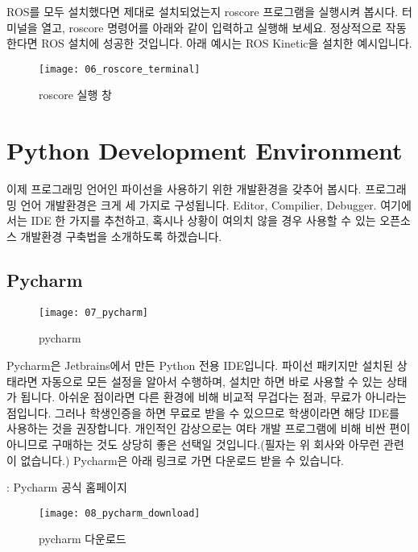 \documentclass[11pt,fleqn]{book} %
\begin{document}
ROS를 모두 설치했다면 제대로 설치되었는지 roscore 프로그램을 실행시켜 봅시다.
터미널을 열고, roscore 명령어를 아래와 같이 입력하고 실행해 보세요. 정상적으로 작동한다면 ROS 설치에 성공한 것입니다. 아래 예시는 ROS Kinetic을 설치한 예시입니다.

\begin{figure}[h]
\centering\texttt{[image: 06\_roscore\_terminal]}
\caption{roscore 실행 창}
\end{figure}


\section{Python Development Environment}

이제 프로그래밍 언어인 파이선을 사용하기 위한 개발환경을 갖추어 봅시다.
프로그래밍 언어 개발환경은 크게 세 가지로 구성됩니다. Editor, Compilier, Debugger.
여기에서는 IDE 한 가지를 추천하고, 혹시나 상황이 여의치 않을 경우 사용할 수 있는 오픈소스 개발환경 구축법을 소개하도록 하겠습니다.

\subsection{Pycharm}

\begin{figure}[h]
\centering\texttt{[image: 07\_pycharm]}
\caption{pycharm}
\end{figure}

Pycharm은 Jetbrains에서 만든 Python 전용 IDE입니다. 파이선 패키지만 설치된 상태라면 자동으로 모든 설정을 알아서 수행하며, 설치만 하면 바로 사용할 수 있는 상태가 됩니다.
아쉬운 점이라면 다른 환경에 비해 비교적 무겁다는 점과, 무료가 아니라는 점입니다. 그러나 학생인증을 하면 무료로 받을 수 있으므로 학생이라면 해당 IDE를 사용하는 것을 권장합니다.
개인적인 감상으로는 여타 개발 프로그램에 비해 비싼 편이 아니므로 구매하는 것도 상당히 좋은 선택일 것입니다.(필자는 위 회사와 아무런 관련이 없습니다.)
Pycharm은 아래 링크로 가면 다운로드 받을 수 있습니다.

\begin{link}
  : Pycharm 공식 홈페이지
\end{link}

\begin{figure}[h]
\centering\texttt{[image: 08\_pycharm\_download]}
\caption{pycharm 다운로드}
\end{figure}
\end{document}
